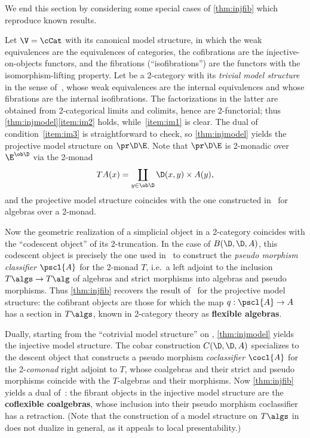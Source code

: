 \begin{verbose}
We end this section by considering some special cases of \cref{thm:injfib} which reproduce known results.

\begin{eg}\label{eg:cat}
  Let $\V=\cCat$ with its canonical model structure, in which the weak equivalences are the equivalences of categories, the cofibrations are the injective-on-objects functors, and the fibrations (``isofibrations'') are the functors with the isomorphism-lifting property.
  Let \E be a 2-category with its \emph{trivial model structure} in the sense of~\cite{lack:htpy-2monads}, whose weak equivalences are the internal equivalences and whose fibrations are the internal isofibrations.
  The factorizations in the latter are obtained from 2-categorical limits and colimits, hence are 2-functorial; thus \cref{thm:injmodel}\ref{item:im2} holds, while~\ref{item:im1} is clear.
  The dual of condition~\ref{item:im3} is straightforward to check, so \cref{thm:injmodel} yields the projective model structure on $\pr\D\E$.
  Note that $\pr\D\E$ is 2-monadic over $\E^{\ob\D}$ via the 2-monad
  \begin{equation}
    T A(x) = \coprod_{y\in\ob\D} \D(x,y)\times A(y),\label{eq:2mnd}
  \end{equation}
  and the projective model structure coincides with the one constructed in~\cite{lack:htpy-2monads} for algebras over a 2-monad.

  Now the geometric realization of a simplicial object in a 2-category coincides with the ``codescent object'' of its 2-truncation.
  In the case of $B(\D,\D,A)$, this codescent object is precisely the one used in~\cite{lack:codescent-coh} to construct the \emph{pseudo morphism classifier} $\pscl{A}$ for the 2-monad $T$, i.e.\ a left adjoint to the inclusion $T\algs \to T\alg$ of algebras and strict morphisms into algebras and pseudo morphisms.
  Thus \cref{thm:injfib} recovers the result of~\cite[Theorem 4.12]{lack:htpy-2monads} for the projective model structure: the cofibrant objects are those for which the map $q:\pscl{A}\to A$ has a section in $T\algs$, known in 2-category theory as \textbf{flexible algebras}.

  Dually, starting from the ``cotrivial model structure'' on \E, \cref{thm:injmodel} yields the injective model structure.
  The cobar construction $C(\D,\D,A)$ specializes to the descent object that constructs a pseudo morphism \emph{coclassifier} $\cocl{A}$ for the 2-\emph{comonad} right adjoint to $T$, whose coalgebras and their strict and pseudo morphisms coincide with the $T$-algebras and their morphisms.
  Now \cref{thm:injfib} yields a dual of~\cite[Theorem 4.12]{lack:htpy-2monads}: the fibrant objects in the injective model structure are the \textbf{coflexible coalgebras}, whose inclusion into their pseudo morphism coclassifier has a retraction.
  (Note that the construction of a model structure on $T\algs$ in~\cite{lack:htpy-2monads} does not dualize in general, as it appeals to local presentability.)


\end{eg}
\end{verbose}
